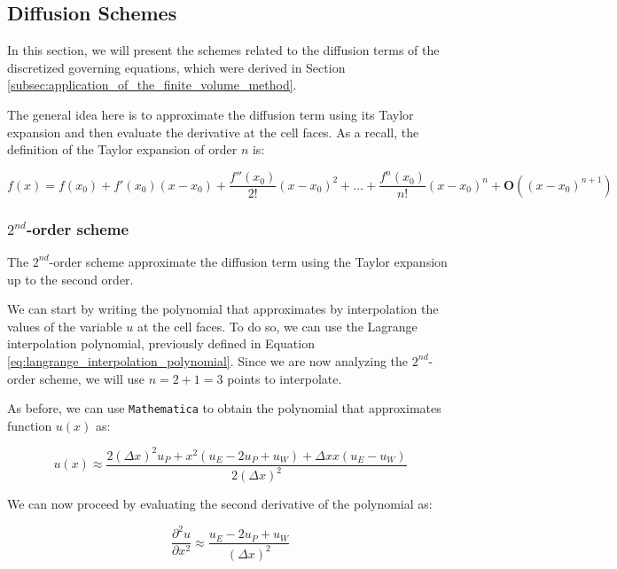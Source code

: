 \subsection{Diffusion Schemes}
\label{subsec:diffusion_schemes}

In this section, we will present the schemes related to the diffusion terms of the discretized governing equations, which were derived in Section \ref{subsec:application_of_the_finite_volume_method}.

The general idea here is to approximate the diffusion term using its Taylor expansion and then evaluate the derivative at the cell faces.
As a recall, the definition of the Taylor expansion of order $n$ is:

\begin{equation}
    f(x) = f(x_0) + f'(x_0)(x - x_0) + \frac{f''(x_0)}{2!}(x - x_0)^2 + \dots + \frac{f^n(x_0)}{n!}(x - x_0)^n + \mathbf{O}((x - x_0)^{n+1})
\end{equation}



%
%
\subsubsection{$2^{nd}$-order scheme}

The $2^{nd}$-order scheme approximate the diffusion term using the Taylor expansion up to the second order.

We can start by writing the polynomial that approximates by interpolation the values of the variable $u$ at the cell faces.
To do so, we can use the Lagrange interpolation polynomial, previously defined in Equation \ref{eq:langrange_interpolation_polynomial}.
Since we are now analyzing the $2^{nd}$-order scheme, we will use $n = 2+1 = 3$ points to interpolate.

As before, we can use \texttt{Mathematica} to obtain the polynomial that approximates function $u(x)$ as:

\begin{equation}
    u(x) \approx \frac{2 (\Delta x)^2 u_{P}+x^2 (u_{E}-2 u_{P}+u_{W})+\Delta x x (u_{E}-u_{W})}{2 (\Delta x)^2}
\end{equation}

We can now proceed by evaluating the second derivative of the polynomial as:

\begin{equation}
    \frac{\partial^2 u}{\partial x^2} \approx \frac{u_{E} - 2 u_{P} + u_{W}}{(\Delta x)^2}
\end{equation}


